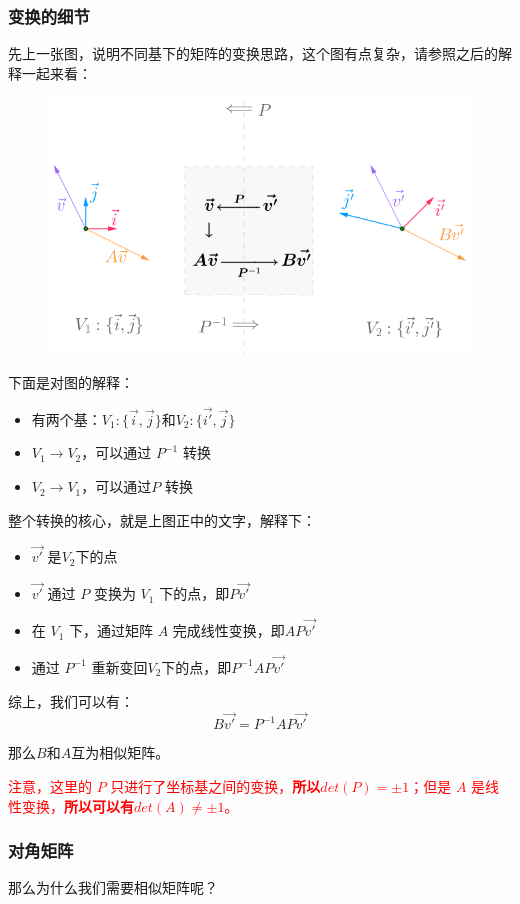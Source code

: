 \documentclass[12pt]{article}
\begin{document}
\subsubsection{变换的细节}
先上一张图，说明不同基下的矩阵的变换思路，这个图有点复杂，请参照之后的解释一起来看：
\begin{figure}[H]
    \centering
    \includegraphics[width=.8\textwidth]{fig/UnderstandSimilarMatrix_3.png}
\end{figure} 

下面是对图的解释：
\begin{itemize}
    \item 有两个基：$V_1:\{\vec{i},\vec{j}\}$和$V_2:\{\vec{i'}, \vec{j}\}$
    \item $V_1 \rightarrow V_2$，可以通过 $P^{-1}$ 转换
    \item $V_2 \rightarrow V_1$，可以通过$P$ 转换
\end{itemize}

整个转换的核心，就是上图正中的文字，解释下：
\begin{itemize}
    \item $\vec{v'}$ 是$V_2$下的点
    \item $\vec{v'}$ 通过 $P$ 变换为 $V_1$ 下的点，即$P\vec{v'}$
    \item 在 $V_1$ 下，通过矩阵 $A$ 完成线性变换，即$AP\vec{v'}$
    \item 通过 $P^{-1}$ 重新变回$V_2$下的点，即$P^{-1}AP\vec{v'}$
\end{itemize}

综上，我们可以有：
$$
B\vec{v'} = P^{-1}AP\vec{v'}
$$

那么$B$和$A$互为相似矩阵。

\textcolor{red}{注意，这里的 $P$ 只进行了坐标基之间的变换，\textbf{所以$det(P) = \pm 1$}；但是 $A$ 是线性变换，\textbf{所以可以有$det(A) \ne \pm 1$}。}

\subsubsection{对角矩阵}
那么为什么我们需要相似矩阵呢？
\end{document}
